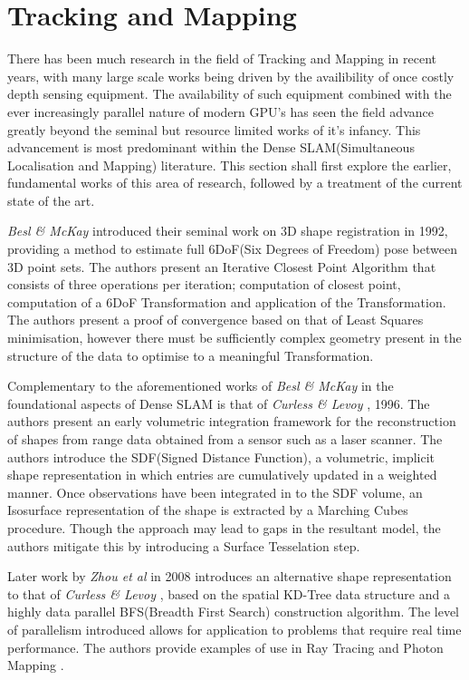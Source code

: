 
\section{Tracking and Mapping}
\label{sec:lit_review_tam}
There has been much research in the field of Tracking and Mapping in recent 
years, with many large scale works being driven by the availibility of once 
costly depth sensing equipment. The availability of such equipment combined 
with the ever increasingly parallel nature of modern GPU's has seen the 
field advance greatly beyond the seminal but resource limited works of it's 
infancy. This advancement is most predominant within the Dense SLAM(Simultaneous 
Localisation and Mapping) literature. This section shall first explore the 
earlier, fundamental works of this area of research, followed by a treatment 
of the current state of the art.

\textit{Besl \& McKay} \cite{Besl1992} introduced their seminal work on 3D shape 
registration in 1992, providing a method to estimate full 6DoF(Six Degrees of 
Freedom) pose between 3D point sets. The authors present an Iterative Closest 
Point Algorithm that consists of three operations per iteration; computation 
of closest point, computation of a 6DoF Transformation and application of 
the Transformation. The authors present a proof of convergence based on that 
of Least Squares minimisation, however there must be sufficiently complex 
geometry present in the structure of the data to optimise to a meaningful 
Transformation.

Complementary to the aforementioned works of \textit{Besl \& McKay} \cite{Besl1992} 
in the foundational aspects of Dense SLAM is that of \textit{Curless \& Levoy} 
\cite{Curless1996}, 1996. The authors present an early volumetric integration 
framework for the reconstruction of shapes from range data obtained from a 
sensor such as a laser scanner. The authors introduce the SDF(Signed Distance Function), 
a volumetric, implicit shape representation in which entries are cumulatively updated 
in a weighted manner. Once observations have been integrated in to the SDF volume, an 
Isosurface representation of the shape is extracted by a Marching Cubes \cite{MC} 
procedure. Though the approach may lead to gaps in the resultant model, the authors 
mitigate this by introducing a Surface Tesselation step.

Later work by \textit{Zhou et al} \cite{Zhou2008} in 2008 introduces an alternative 
shape representation to that of \textit{Curless \& Levoy} \cite{Curless1996}, based 
on the spatial KD-Tree data structure and a highly data parallel BFS(Breadth First 
Search) construction algorithm. The level of parallelism introduced allows for 
application to problems that require real time performance. The authors provide 
examples of use in Ray Tracing \cite{RT} and Photon Mapping \cite{PM}.

